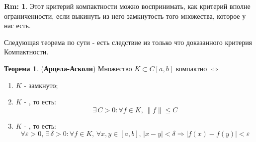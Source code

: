 \documentclass[12pt]{article}
\newcommand{\VE}{\varepsilon}
\theoremstyle{definition}
\newtheorem{rem}{Rm:}
\newtheorem{theorem}{Теорема}
\begin{document}
\begin{rem}
	Этот критерий компактности можно воспринимать, как критерий вполне ограниченности, если выкинуть из него замкнутость того множества, которое у нас есть.
\end{rem}
Следующая теорема по сути - есть следствие из только что доказанного критерия Компактности.

\begin{theorem}(\textbf{Арцела-Асколи})
	Множество $K \subset C[a,b]$ компактно $\Leftrightarrow$ 
	\begin{enumerate}[label={\arabic*)}]
		\item $K$ - замкнуто;
		\item $K$ - , то есть: 
		$$	
			\exists \, C > 0 \colon \forall f \in K, \, \|f\| \leq C
		$$
		\item $K$ - , то есть: 
		$$
			\forall \VE > 0, \, \exists \, \delta > 0 \colon \forall f \in K, \, \forall x,y \in [a,b],\,  |x - y| < \delta \Rightarrow  |f(x) - f(y)| < \VE
		$$
	\end{enumerate}
\end{theorem}
\end{document}

